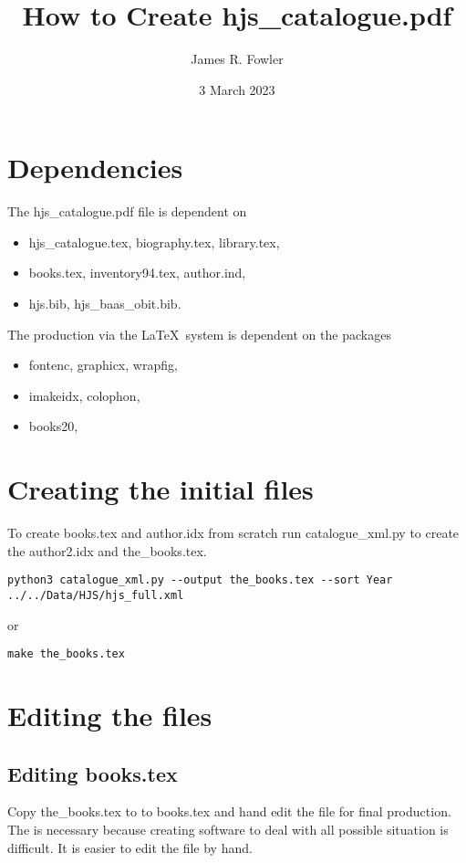 \documentclass{article}
\begin{document}
\title{How to Create hjs\_catalogue.pdf}
\author{James R. Fowler}
\date{3 March 2023}

\maketitle

\section{Dependencies}

The hjs\_catalogue.pdf file is dependent on
\begin{itemize}
  \item hjs\_catalogue.tex, biography.tex, library.tex,
  \item books.tex, inventory94.tex, author.ind,
  \item hjs.bib, hjs\_baas\_obit.bib.
\end{itemize}

\noindent
The production via the \LaTeX\ system is dependent on the packages
\begin{itemize}
  \item fontenc, graphicx, wrapfig,
  \item imakeidx, colophon,
  \item books20,
\end{itemize}


\section{Creating the initial files}
To create books.tex and author.idx from scratch run catalogue\_xml.py
to create the author2.idx and the\_books.tex.

\begin{verbatim}
python3 catalogue_xml.py --output the_books.tex --sort Year ../../Data/HJS/hjs_full.xml
\end{verbatim}
or
\begin{verbatim}
make the_books.tex
\end{verbatim}

\section{Editing the files}
\subsection{Editing books.tex}
Copy the\_books.tex to to books.tex and hand edit the file for final
production. The is necessary because creating software to deal with
all possible situation is difficult.  It is easier to edit the file by
hand.
\end{document}
